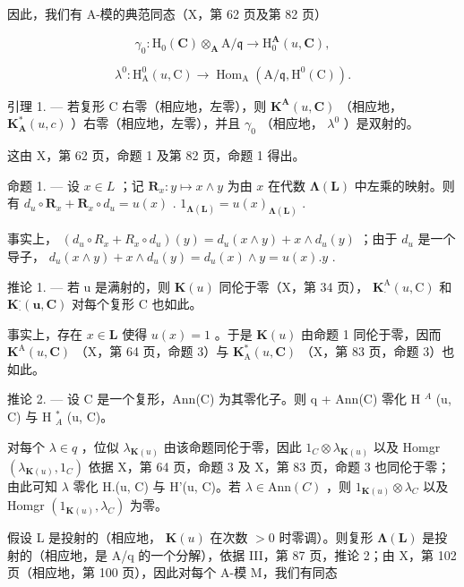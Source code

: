 因此，我们有 A-模的典范同态（X，第 62 页及第 82 页）

\[
\gamma_ {0}: \mathrm{H} _ {0} (\mathbf {C}) \otimes_ {\mathbf {A}} \mathrm{A} / \mathfrak {q} \rightarrow \mathrm{H} _ {0} ^ {\mathbf {A}} (u, \mathbf {C}),
\]

\[
\lambda^ {0}: \mathrm{H} _ {\mathrm{A}} ^ {0} (u, \mathrm{C}) \rightarrow \operatorname{Hom} _ {\mathrm{A}} (\mathrm{A} / \mathfrak {q}, \mathrm{H} ^ {0} (\mathrm{C})).
\]

引理 1. --- 若复形 C 右零（相应地，左零），则 \(\mathbf{K}^{\mathbf{A}}(u,\mathbf{C})\) （相应地， \(\mathbf{K}_{\mathbf{A}}^{*}(u,c)\) ）右零（相应地，左零），并且 \(\gamma_{0}\) （相应地， \(\lambda^{0}\) ）是双射的。

这由 X，第 62 页，命题 1 及第 82 页，命题 1 得出。

命题 1. --- 设 \(x \in L\) ；记 \(\mathbf{R}_{x}: y \mapsto x \wedge y\) 为由 \(x\) 在代数 \(\boldsymbol{\Lambda}(\mathbf{L})\) 中左乘的映射。则有 \(d_{u} \circ \mathbf{R}_{x} + \mathbf{R}_{x} \circ d_{u} = u(x)\) . \(1_{\boldsymbol{\Lambda}(\mathbf{L})} = u(x)_{\boldsymbol{\Lambda}(\mathbf{L})}\) .

事实上， \((d_u \circ R_x + R_x \circ d_u)(y) = d_u(x \wedge y) + x \wedge d_u(y)\) ；由于 \(d_u\) 是一个导子， \(d_u(x \wedge y) + x \wedge d_u(y) = d_u(x) \wedge y = u(x).y\) .

推论 1. --- 若 u 是满射的，则 \(\mathbf{K}(u)\) 同伦于零（X，第 34 页）， \(\mathbf{K}_{\cdot}^{\mathrm{A}}(u,\mathrm{C})\) 和 \(\mathbf{K}_{\cdot}^{\cdot}(\mathbf{u},\mathbf{C})\) 对每个复形 C 也如此。

事实上，存在 \(x \in \mathbf{L}\) 使得 \(u(x) = 1\) 。于是 \(\mathbf{K}(u)\) 由命题 1 同伦于零，因而 \(\mathbf{K}^{\mathrm{A}}(u, \mathbf{C})\) （X，第 64 页，命题 3）与 \(\mathbf{K}_{\mathrm{A}}^{*}(u, \mathbf{C})\) （X，第 83 页，命题 3）也如此。

推论 2. --- 设 C 是一个复形，Ann(C) 为其零化子。则 q + Ann(C) 零化 H \(^{A}\) (u, C) 与 H \(^{*}_{A}\) (u, C)。

对每个 \(\lambda \in q\) ，位似 \(\lambda_{\mathbf{K}(u)}\) 由该命题同伦于零，因此 \(1_{C} \otimes \lambda_{\mathbf{K}(u)}\) 以及 Homgr \((\lambda_{\mathbf{K}(u)}, 1_{C})\) 依据 X，第 64 页，命题 3 及 X，第 83 页，命题 3 也同伦于零；由此可知 \(\lambda\) 零化 H.(u, C) 与 H'(u, C)。若 \(\lambda \in \text{Ann}(C)\) ，则 \(1_{\mathbf{K}(u)} \otimes \lambda_{C}\) 以及 Homgr \((1_{\mathbf{K}(u)}, \lambda_{C})\) 为零。

假设 L 是投射的（相应地， \(\mathbf{K}(u)\) 在次数 \(>0\) 时零调）。则复形 \(\symbf{\Lambda}(\mathbf{L})\) 是投射的（相应地，是 A/q 的一个分解），依据 III，第 87 页，推论 2；由 X，第 102 页（相应地，第 100 页），因此对每个 A-模 M，我们有同态

